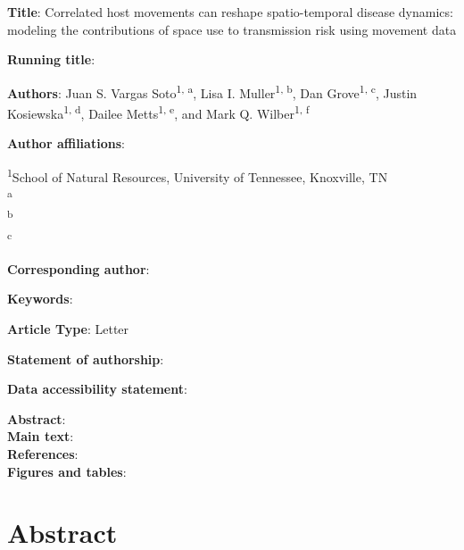 \documentclass[letterpaper]{article}
\begin{document}
\noindent
\textbf{Title}: Correlated host movements can reshape spatio-temporal disease dynamics: modeling the contributions of space use to transmission risk using movement data

\bigskip

\noindent
\textbf{Running title}: 

\bigskip

\noindent
\textbf{Authors}: Juan S. Vargas Soto\textsuperscript{1, a}, Lisa I. Muller\textsuperscript{1, b}, Dan Grove\textsuperscript{1, c}, Justin Kosiewska\textsuperscript{1, d}, Dailee Metts\textsuperscript{1, e}, and Mark Q. Wilber\textsuperscript{1, f}

\bigskip

\noindent
\textbf{Author affiliations}:

\noindent
\textsuperscript{1}School of Natural Resources, University of Tennessee, Knoxville, TN \\
\textsuperscript{a} \\
\textsuperscript{b} \\
\textsuperscript{c}

\bigskip

\noindent
\textbf{Corresponding author}:

\bigskip

\noindent
\textbf{Keywords}:

\bigskip

\noindent
\textbf{Article Type}: Letter

\bigskip
\noindent
\textbf{Statement of authorship}: 

\bigskip
\noindent
\textbf{Data accessibility statement}: 

\bigskip
\noindent
\textbf{Abstract}:  \\
\textbf{Main text}:  \\
\textbf{References}:  \\
\textbf{Figures and tables}: \\

\newpage

\doublespacing
\linenumbers

\section*{Abstract}
\end{document}
